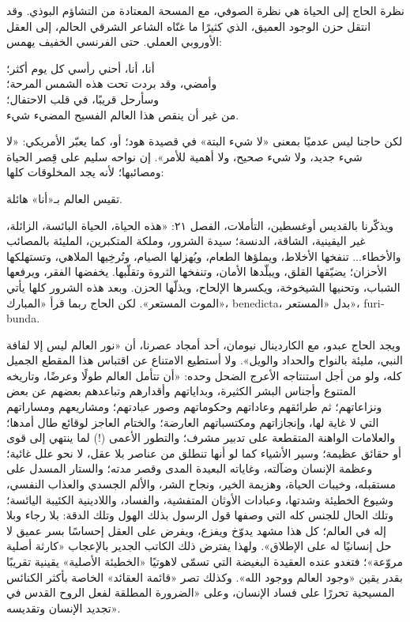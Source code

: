 نظرة الحاج إلى الحياة هي نظرة الصوفي، مع المسحة المعتادة من التشاؤم البوذي. وقد انتقل حزن الوجود العميق، الذي كثيرًا ما غنّاه الشاعر الشرقي الحالم، إلى العقل الأوروبي العملي. حتى الفرنسي الخفيف يهمس:

\begin{SourceQuotation}
أنا، أنا، أحني رأسي كل يوم أكثر؛\\
وأمضي، وقد بردت تحت هذه الشمس المرحة؛\\
وسأرحل قريبًا، في قلب الاحتفال؛\\
من غير أن ينقص هذا العالم الفسيح المضيء شيء.
\end{SourceQuotation}

لكن حاجنا ليس عدميًا بمعنى «لا شيء البتة» في قصيدة هود؛ أو، كما يعبّر الأمريكي: «لا شيء جديد، ولا شيء صحيح، ولا أهمية للأمر». إن نواحه سليم على قِصر الحياة ومصائبها؛ لأنه يجد المخلوقات كلها:

\begin{SourceQuotation}
تقيس العالم بـ«أنا» هائلة.
\end{SourceQuotation}

ويذكّرنا بالقديس أوغسطين، التأملات، الفصل ٢١: «هذه الحياة، الحياة البائسة، الزائلة، غير اليقينية، الشاقة، الدنسة؛ سيدة الشرور، وملكة المتكبرين، المليئة بالمصائب والأخطاء... تنفخها الأخلاط، ويملؤها الطعام، ويُهزلها الصيام، وتُرخِيها الملاهي، وتستهلكها الأحزان؛ يضيّقها القلق، ويبلّدها الأمان، وتنفخها الثروة وتقلّبها. يخفضها الفقر، ويرفعها الشباب، وتحنيها الشيخوخة، ويكسرها الإلحاح، ويذلّها الحزن. وبعد هذه الشرور كلها يأتي الموت المستعر». لكن الحاج ربما قرأ «المبارك»، \textenglish{benedicta}، بدل «المستعر»، \textenglish{furibunda}.

ويجد الحاج عبدو، مع الكاردينال نيومان، أحد أمجاد عصرنا، أن «نور العالم ليس إلا لفافة النبي، مليئة بالنواح والحداد والويل». ولا أستطيع الامتناع عن اقتباس هذا المقطع الجميل كله، ولو من أجل استنتاجه الأعرج الضحل وحده: «أن تتأمل العالم طولًا وعرضًا، وتاريخه المتنوع وأجناس البشر الكثيرة، وبداياتهم وأقدارهم وتباعدهم بعضهم عن بعض ونزاعاتهم؛ ثم طرائقهم وعاداتهم وحكوماتهم وصور عبادتهم؛ ومشاريعهم ومساراتهم التي لا غاية لها، وإنجازاتهم ومكتسباتهم العارضة؛ والختام العاجز لوقائع طال أمدها؛ والعلامات الواهنة المتقطعة على تدبير مشرف؛ والتطور الأعمى (!) لما ينتهي إلى قوى أو حقائق عظيمة؛ وسير الأشياء كما لو أنها تنطلق من عناصر بلا عقل، لا نحو علل غائية؛ وعظمة الإنسان وضآلته، وغاياته البعيدة المدى وقصر مدته؛ والستار المسدل على مستقبله، وخيبات الحياة، وهزيمة الخير، ونجاح الشر، والألم الجسدي والعذاب النفسي، وشيوع الخطيئة وشدتها، وعبادات الأوثان المتفشية، والفساد، واللادينية الكئيبة اليائسة؛ وتلك الحال للجنس كله التي وصفها قول الرسول بذلك الهول وتلك الدقة: بلا رجاء وبلا إله في العالم؛ كل هذا مشهد يدوّخ ويفزع، ويفرض على العقل إحساسًا بسر عميق لا حل إنسانيًا له على الإطلاق». ولهذا يفترض ذلك الكاتب الجدير بالإعجاب «كارثة أصلية مروّعة»؛ فتغدو عنده العقيدة البغيضة التي تسمّى لاهوتيًا «الخطيئة الأصلية» يقينية تقريبًا بقدر يقين «وجود العالم ووجود الله». وكذلك تصر «قائمة العقائد» الخاصة بأكثر الكنائس المسيحية تحررًا على فساد الإنسان، وعلى «الضرورة المطلقة لفعل الروح القدس في تجديد الإنسان وتقديسه».


